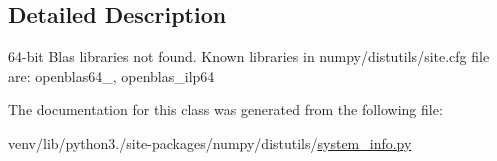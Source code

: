 \subsection{Detailed Description}
\begin{DoxyVerb}64-bit Blas libraries not found.
Known libraries in numpy/distutils/site.cfg file are:
openblas64_, openblas_ilp64
\end{DoxyVerb}
 

The documentation for this class was generated from the following file\+:\begin{DoxyCompactItemize}
\item 
venv/lib/python3./site-\/packages/numpy/distutils/\hyperlink{system__info_8py}{system\+\_\+info.\+py}\end{DoxyCompactItemize}
